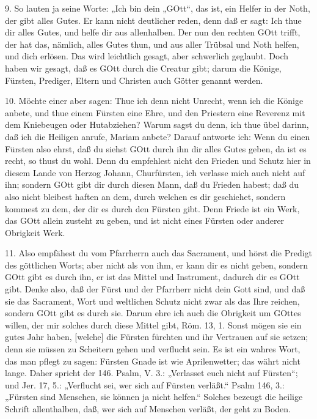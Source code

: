 9. So lauten ja seine Worte: „Ich bin dein
„GOtt“, das ist, ein Helfer in der Noth, der gibt alles Gutes. Er kann nicht deutlicher reden, denn daß er sagt: Ich thue dir alles Gutes, und helfe dir aus allenhalben. Der nun den rechten GOtt trifft, der hat das, nämlich, alles Gutes thun, und aus aller Trübsal und Noth helfen, und dich erlösen. Das wird leichtlich gesagt, aber schwerlich geglaubt. Doch haben wir gesagt, daß es GOtt durch die Creatur gibt; darum die Könige, Fürsten, Prediger, Eltern und Christen auch Götter genannt werden.

10. Möchte einer aber sagen: Thue ich denn nicht Unrecht, wenn ich die Könige anbete, und thue einem Fürsten eine Ehre, und den Priestern eine Reverenz mit dem Kniebeugen oder Hutabziehen? Warum sagst du denn, ich thue übel darinn, daß ich die Heiligen anrufe, Mariam anbete? Darauf antworte ich: Wenn du einen Fürsten also ehrst, daß du siehst GOtt durch ihn dir alles Gutes geben, da ist es recht, so thust du wohl. Denn du empfehlest nicht den Frieden und Schutz hier in diesem Lande von Herzog Johann, Churfürsten, ich verlasse mich auch nicht auf ihn; sondern GOtt gibt dir durch diesen Mann, daß du Frieden habest; daß du also nicht bleibest haften an dem, durch welchen es dir geschiehet, sondern kommest zu dem, der dir es durch den Fürsten gibt. Denn Friede ist ein Werk, das GOtt allein zusteht zu geben, und ist nicht eines Fürsten oder anderer Obrigkeit Werk.

11. Also empfähest du vom Pfarrherrn auch das Sacrament, und hörst die Predigt des göttlichen Worts; aber nicht als von ihm, er kann dir es nicht geben, sondern GOtt gibt es durch ihn, er ist das Mittel und Instrument, dadurch dir es GOtt gibt. Denke also, daß der Fürst und der Pfarrherr nicht dein Gott sind, und daß sie das Sacrament, Wort und weltlichen Schutz nicht zwar als das Ihre reichen, sondern GOtt gibt es durch sie. Darum ehre ich auch die Obrigkeit um GOttes willen, der mir solches durch diese Mittel gibt, Röm. 13, 1. Sonst mögen sie ein gutes Jahr haben, [welche] die Fürsten fürchten und ihr Vertrauen auf sie setzen; denn sie müssen zu Scheitern gehen und verflucht sein. Es ist ein wahres Wort, das man pflegt zu sagen: Fürsten Gnade ist wie Aprilenwetter; das währt nicht lange. Daher spricht der 146. Psalm, V. 3.: „Verlasset euch nicht auf Fürsten“; und Jer. 17, 5.: „Verflucht sei, wer sich auf Fürsten verläßt.“ Psalm 146, 3.: „Fürsten sind Menschen, sie können ja nicht helfen.“ Solches bezeugt die heilige Schrift allenthalben, daß, wer sich auf Menschen verläßt, der geht zu Boden.

